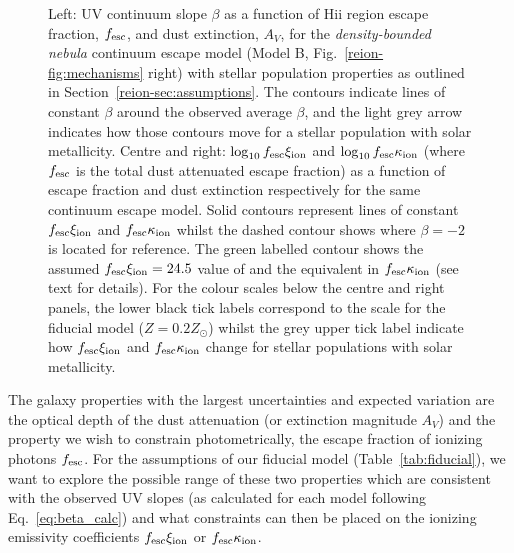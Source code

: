 \begin{landscape}
\begin{figure}
  \caption[UV continuum slope $\beta$, $\log_{10}f_{\rm{esc}}\xi_{\rm{ion}}$ and $\log_{10}f_{\rm{esc}}\kappa_{\rm{ion}}$ as a function of total escape fraction, $f_{\rm{esc}}$, and dust extinction, $A_{V}$, for the \emph{density-bounded nebula} continuum escape model (Model B, Fig.~\ref{reion-fig:mechanisms} right) with stellar population properties as outlined in Section~\ref{reion-sec:assumptions}.]{Left: UV continuum slope $\beta$ as a function of {\sc Hii} region escape fraction, $f_{\rm{esc}}$, and dust extinction, $A_{V}$, for the \emph{density-bounded nebula} continuum escape model (Model B, Fig.~\ref{reion-fig:mechanisms} right) with stellar population properties as outlined in Section~\ref{reion-sec:assumptions}. The contours indicate lines of constant $\beta$ around the observed average $\beta$, and the light grey arrow indicates how those contours move for a stellar population with solar metallicity. Centre and right: $\log_{10}f_{\rm{esc}}\xi_{\rm{ion}}$ and $\log_{10}f_{\rm{esc}}\kappa_{\rm{ion}}$ (where $f_{\rm{esc}}$ is the total dust attenuated escape fraction) as a function of escape fraction and dust extinction respectively for the same continuum escape model. Solid contours represent lines of constant $f_{\rm{esc}}\xi_{\rm{ion}}$ and $f_{\rm{esc}}\kappa_{\rm{ion}}$ whilst the dashed contour shows where $\beta = -2$ is located for reference. The green labelled contour shows the assumed $f_{\rm{esc}}\xi_{\rm{ion}} = 24.5$ value of  and the equivalent in $f_{\rm{esc}}\kappa_{\rm{ion}}$ (see text for details). For the colour scales below the centre and right panels, the lower black tick labels correspond to the scale for the fiducial model ($Z = 0.2 Z_{\odot}$) whilst the grey upper tick label indicate how $f_{\rm{esc}}\xi_{\rm{ion}}$ and $f_{\rm{esc}}\kappa_{\rm{ion}}$ change for stellar populations with solar metallicity.}
  \label{reion-fig:fesc_dens}
\end{figure}
\end{landscape}

The galaxy properties with the largest uncertainties and expected variation are the optical depth of the dust attenuation (or extinction magnitude $A_{V}$)  and the property we wish to constrain photometrically, the escape fraction of ionizing photons $f_{\rm{esc}}$. For the assumptions of our fiducial model (Table~\ref{tab:fiducial}), we want to explore the possible range of these two properties which are consistent with the observed UV slopes (as calculated for each model following Eq.~\ref{eq:beta_calc}) and what constraints can then be placed on the ionizing emissivity coefficients $f_{\rm{esc}}\xi_{\rm{ion}}$ or $f_{\rm{esc}}\kappa_{\rm{ion}}$.

